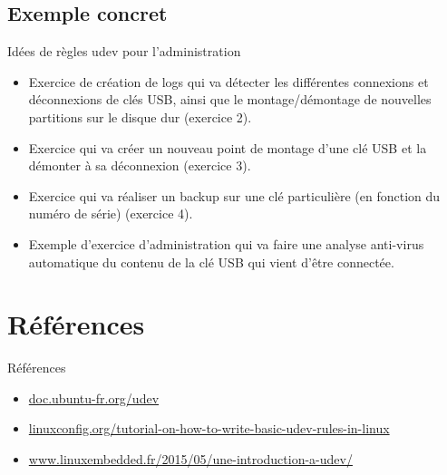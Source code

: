 \documentclass{beamer}
\begin{document}
\subsection{Exemple concret}
\begin{frame}
\begin{exampleblock}{Idées de règles udev pour l'administration}
	\begin{itemize}
		[circle]
		\item Exercice de création de logs qui va détecter les différentes connexions et déconnexions de clés USB, ainsi que le montage/démontage
		de nouvelles partitions sur le disque dur (exercice 2).
	    \item Exercice qui va créer un nouveau point de montage d'une clé USB et la démonter à sa déconnexion (exercice 3).
		\item Exercice qui va réaliser un backup sur une clé particulière (en fonction du numéro de série) (exercice 4).
		\item Exemple d'exercice d'administration qui va faire une analyse anti-virus automatique du contenu de la clé USB qui vient d'être connectée.
		
	\end{itemize}
\end{exampleblock}
\end{frame}

\section{Références}

 \begin{frame}
\begin{block}{Références} 
	\begin{itemize}
		[circle]
		\item \footnotesize \url{doc.ubuntu-fr.org/udev} \normalsize
		\item \footnotesize \url{linuxconfig.org/tutorial-on-how-to-write-basic-udev-rules-in-linux} \normalsize
		\item \footnotesize \url{www.linuxembedded.fr/2015/05/une-introduction-a-udev/} \normalsize
	\end{itemize}
\end{block}
\end{frame}
      
\end{document}
